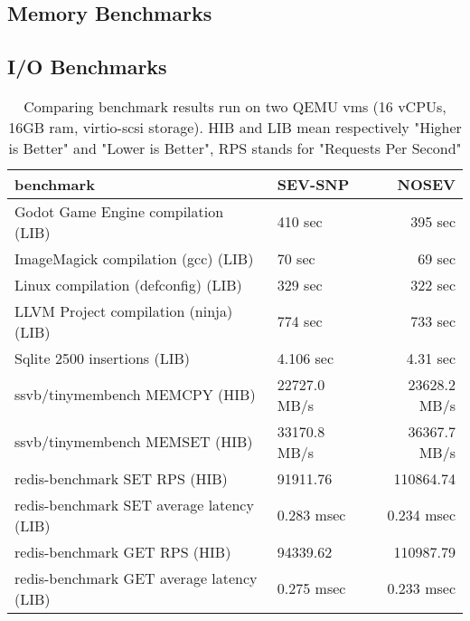 \documentclass[twocolumn]{article}
\begin{document}
\subsection{Memory Benchmarks}


\subsection{I/O Benchmarks}

\begin{table*}
    \centering
    \label{tab:tinyben-results}
    \begin{tabular}{l|l|r}
        \textbf{benchmark} &       \textbf{SEV-SNP} &       \textbf{NOSEV} \\
    \hline
    Godot Game Engine compilation (LIB)       &  410 sec         & 395 sec  \\
    ImageMagick compilation (gcc) (LIB)       &  70 sec          & 69 sec \\
    Linux compilation (defconfig) (LIB)       &  329 sec         & 322 sec \\
    LLVM Project compilation (ninja) (LIB)    &  774 sec         & 733 sec  \\
    Sqlite 2500 insertions (LIB)              &  4.106 sec       & 4.31 sec \\
    ssvb/tinymembench MEMCPY (HIB)            &  22727.0 MB/s  & 23628.2 MB/s \\
    ssvb/tinymembench MEMSET (HIB)            &  33170.8 MB/s  & 36367.7 MB/s \\
    redis-benchmark SET RPS (HIB)             &  91911.76      & 110864.74 \\
    redis-benchmark SET average latency (LIB) &  0.283 msec      & 0.234 msec \\
    redis-benchmark GET RPS (HIB)             &  94339.62      & 110987.79 \\
    redis-benchmark GET average latency (LIB) &  0.275 msec	   & 0.233 msec \\
    \end{tabular}
    \caption{Comparing benchmark results run on two QEMU vms (16 vCPUs, 16GB ram, virtio-scsi storage). HIB and LIB mean respectively "Higher is Better" and "Lower is Better", RPS stands for "Requests Per Second"} 
\end{table*}
\end{document}
